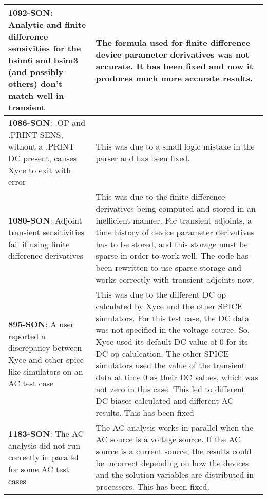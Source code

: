{\begin{longtable}[h] {>{\raggedright\small}m{2in}|>{\raggedright\let\\\tabularnewline\small}m{3.5in}}
\textbf{1092-SON}: Analytic and finite difference sensivities for the bsim6 and bsim3 (and possibly others) don't match well in transient &   The formula used for finite difference device parameter derivatives was not accurate.  It has been fixed and now it produces much more accurate results.  
\\ \hline

\textbf{1086-SON}: .OP and .PRINT SENS, without a .PRINT DC present, causes Xyce to exit with error  &  This was due to a small logic mistake in the parser and has been fixed.
\\ \hline

\textbf{1080-SON}: Adjoint transient sensitivities fail if using finite difference derivatives  &  This was due to the finite difference derivatives being computed and stored in an inefficient manner.  For transient adjoints, a time history of device parameter derivatives has to be stored, and this storage must be sparse in order to work well.  The code has been rewritten to use sparse storage and works correctly with transient adjoints now.
\\ \hline

\textbf{895-SON}: A user reported a discrepancy between Xyce and other spice-like simulators on an AC test case &  This was due to the 
different DC op calculated by Xyce and the other SPICE simulators. For this test case, the DC data was not specified in the voltage source. So, Xyce used its default DC value of 0 for its DC op calulcation. The other SPICE simulators used the value of the transient data at time 0 as their DC values,
which was not zero in this case. This led to different DC biases calculated and different AC results. This has been fixed
\\ \hline

\textbf{1183-SON}: The AC analysis did not run correctly in parallel for some AC test cases & The AC analysis works in parallel
when the AC source is a voltage source. If the AC source is a current source, the results could be incorrect
depending on how the devices and the solution variables are distributed in processors. This has been fixed.
\\ \hline

\end{longtable}
}
